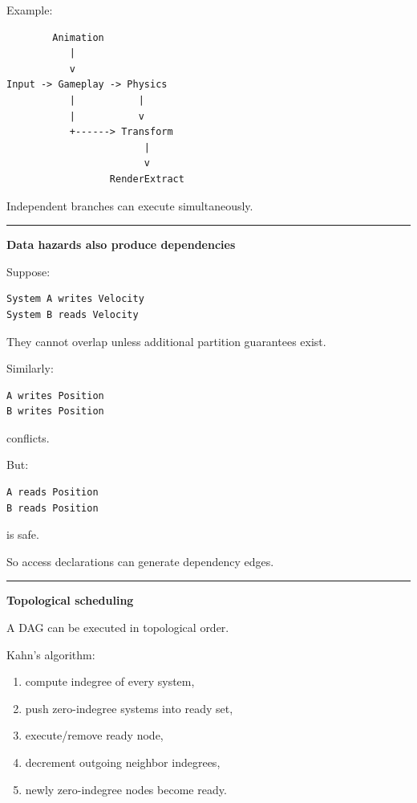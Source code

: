 Example:

\begin{verbatim}
        Animation
           |
           v
Input -> Gameplay -> Physics
           |           |
           |           v
           +------> Transform
                        |
                        v
                  RenderExtract
\end{verbatim}

Independent branches can execute simultaneously.

\begin{center}\rule{0.5\linewidth}{0.5pt}\end{center}

\textbf{Data hazards also produce dependencies}

Suppose:

\begin{verbatim}
System A writes Velocity
System B reads Velocity
\end{verbatim}

They cannot overlap unless additional partition guarantees exist.

Similarly:

\begin{verbatim}
A writes Position
B writes Position
\end{verbatim}

conflicts.

But:

\begin{verbatim}
A reads Position
B reads Position
\end{verbatim}

is safe.

So access declarations can generate dependency edges.

\begin{center}\rule{0.5\linewidth}{0.5pt}\end{center}

\textbf{Topological scheduling}

A DAG can be executed in topological order.

Kahn's algorithm:

\begin{enumerate}
\def\labelenumi{\arabic{enumi}.}
\tightlist
\item
  compute indegree of every system,
\item
  push zero-indegree systems into ready set,
\item
  execute/remove ready node,
\item
  decrement outgoing neighbor indegrees,
\item
  newly zero-indegree nodes become ready.
\end{enumerate}

